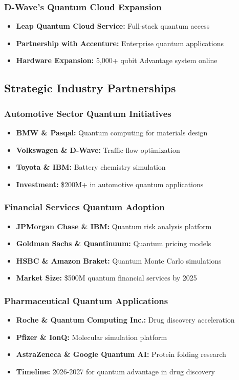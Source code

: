 \documentclass[12pt,a4paper]{article}
\begin{document}
\subsubsection{D-Wave's Quantum Cloud Expansion}
\begin{itemize}
    \item \textbf{Leap Quantum Cloud Service:} Full-stack quantum access
    \item \textbf{Partnership with Accenture:} Enterprise quantum applications
    \item \textbf{Hardware Expansion:} 5,000+ qubit Advantage system online
\end{itemize}

\subsection{Strategic Industry Partnerships}

\subsubsection{Automotive Sector Quantum Initiatives}
\begin{itemize}
    \item \textbf{BMW \& Pasqal:} Quantum computing for materials design
    \item \textbf{Volkswagen \& D-Wave:} Traffic flow optimization
    \item \textbf{Toyota \& IBM:} Battery chemistry simulation
    \item \textbf{Investment:} \$200M+ in automotive quantum applications
\end{itemize}

\subsubsection{Financial Services Quantum Adoption}
\begin{itemize}
    \item \textbf{JPMorgan Chase \& IBM:} Quantum risk analysis platform
    \item \textbf{Goldman Sachs \& Quantinuum:} Quantum pricing models
    \item \textbf{HSBC \& Amazon Braket:} Quantum Monte Carlo simulations
    \item \textbf{Market Size:} \$500M quantum financial services by 2025
\end{itemize}

\subsubsection{Pharmaceutical Quantum Applications}
\begin{itemize}
    \item \textbf{Roche \& Quantum Computing Inc.:} Drug discovery acceleration
    \item \textbf{Pfizer \& IonQ:} Molecular simulation platform
    \item \textbf{AstraZeneca \& Google Quantum AI:} Protein folding research
    \item \textbf{Timeline:} 2026-2027 for quantum advantage in drug discovery
\end{itemize}
\end{document}
